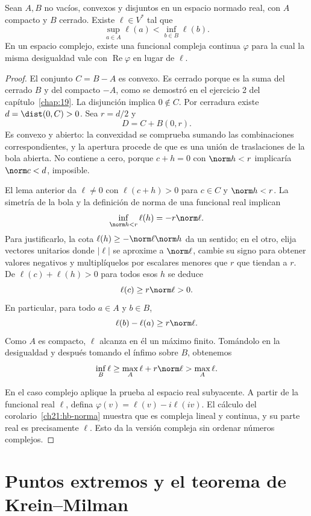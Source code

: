 \begin{teorema}\label{ch24:separacion}
Sean $A,B$ no vacíos, convexos y disjuntos en un espacio normado real, con $A$ compacto y $B$ cerrado. Existe $\ell\in V^*$ tal que
\[
 \sup_{a\in A}\ell(a)<\inf_{b\in B}\ell(b).
\]
En un espacio complejo, existe una funcional compleja continua $\varphi$ para la cual la misma desigualdad vale con $\operatorname{Re}\varphi$ en lugar de $\ell$.
\end{teorema}
\begin{proof}
El conjunto $C=B-A$ es convexo. Es cerrado porque es la suma del cerrado $B$ y del compacto $-A$, como se demostró en el ejercicio 2 del capítulo~\ref{chap:19}. La disjunción implica $0\notin C$. Por cerradura existe $d=\dist(0,C)>0$. Sea $r=d/2$ y
\[
 D=C+B(0,r).
\]
Es convexo y abierto: la convexidad se comprueba sumando las combinaciones correspondientes, y la apertura procede de que es una unión de traslaciones de la bola abierta. No contiene a cero, porque $c+h=0$ con $\norm h<r$ implicaría $\norm c<d$, imposible.

El lema anterior da $\ell\ne0$ con $\ell(c+h)>0$ para $c\in C$ y $\norm h<r$. La simetría de la bola y la definición de norma de una funcional real implican
\[
 \inf_{\norm h<r}\ell(h)=-r\norm\ell.
\]
Para justificarlo, la cota $\ell(h)\geq-\norm\ell\norm h$ da un sentido; en el otro, elija vectores unitarios donde $|\ell|$ se aproxime a $\norm\ell$, cambie su signo para obtener valores negativos y multiplíquelos por escalares menores que $r$ que tiendan a $r$. De $\ell(c)+\ell(h)>0$ para todos esos $h$ se deduce
\[
 \ell(c)\geq r\norm\ell>0.
\]
En particular, para todo $a\in A$ y $b\in B$,
\[
 \ell(b)-\ell(a)\geq r\norm\ell.
\]
Como $A$ es compacto, $\ell$ alcanza en él un máximo finito. Tomándolo en la desigualdad y después tomando el ínfimo sobre $B$, obtenemos
\[
 \inf_B\ell\geq\max_A\ell+r\norm\ell>\max_A\ell.
\]

En el caso complejo aplique la prueba al espacio real subyacente. A partir de la funcional real $\ell$, defina $\varphi(v)=\ell(v)-i\ell(iv)$. El cálculo del corolario~\ref{ch21:hb-norma} muestra que es compleja lineal y continua, y su parte real es precisamente $\ell$. Esto da la versión compleja sin ordenar números complejos.
\end{proof}

\section{Puntos extremos y el teorema de Krein--Milman}

